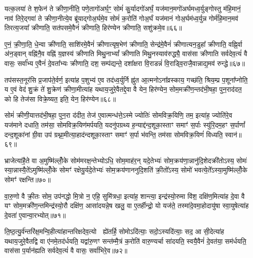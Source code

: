 {\anuvakamend[{इत॑रम्पशु॒मान्थ्स्या᳚द्या॒त्यन॑सो॒थ्सर्ग॑न्तू॒ष्णीꣳ स॑र्वदेव॒त्यं॑ वै त्रय॑स्त्रिꣳशच्च॥९॥}]}

यत्क॒लया॑ ते श॒फेन॑ ते क्रीणा॒नीति॒ पणे॒तागो॑अर्घ॒ꣳ॒ सोमं॑ कु॒र्यादगो॑अर्घं॒ यज॑मान॒मगो॑अर्घमध्व॒र्युङ्गोस्तु म॑हि॒मानं॒ नाव॑ तिरे॒द्गवा॑ ते क्रीणा॒नीत्ये॒व ब्रू॑याद्गोअ॒र्घमे॒व सोमं॑ क॒रोति॑ गोअ॒र्घं यज॑मानं गोअ॒र्घम॑ध्व॒र्युन्न गोर्म॑हि॒मान॒मव॑ तिरत्य॒जया᳚ क्रीणाति॒ सत॑पसमे॒वैनं॑ क्रीणाति॒ हिर॑ण्येन क्रीणाति॒ सशु॑क्रमे॒व॥६६॥

ए॒नं॒ क्री॒णा॒ति॒ धे॒न्वा क्री॑णाति॒ साशि॑रमे॒वैनं॑ क्रीणात्यृष॒भेण॑ क्रीणाति॒ सेन्द्र॑मे॒वैनं॑ क्रीणात्यन॒डुहा᳚ क्रीणाति॒ वह्नि॒र्वा अ॑न॒ड्वान् वह्नि॑नै॒व वह्नि॑ य॒ज्ञस्य॑ क्रीणाति मिथु॒ना\-भ्यां᳚ क्रीणाति मिथु॒नस्याव॑रुद्ध्यै॒ वास॑सा क्रीणाति सर्वदेव॒त्यं॑ वै वासः॒ सर्वा᳚भ्य ए॒वैनं॑ दे॒वता᳚भ्यः क्रीणाति॒ दश॒ सम्प॑द्यन्ते॒ दशा᳚क्षरा वि॒राडन्नं॑ वि॒राड्वि॒राजै॒वान्नाद्य॒मव॑ रुन्द्धे॥६७॥

तप॑सस्त॒नूर॑सि प्र॒जाप॑ते॒र्वर्ण॒ इत्या॑ह प॒शुभ्य॑ ए॒व तद॑ध्व॒र्युर्नि ह्नु॑त आ॒त्मनो\-ऽना᳚व्रस्काय॒ गच्छ॑ति॒ श्रिय॒म्प्र प॒शूना᳚प्नोति॒ य ए॒वं वेद॑ शु॒क्रं ते॑ शु॒क्रेण॑ क्रीणा॒मीत्या॑ह यथाय॒जुरे॒वैतद्दे॒वा वै येन॒ हिर॑ण्येन॒ सोम॒मक्री॑ण॒न्तद॑भी॒षहा॒ पुन॒राद॑दत॒ को हि तेज॑सा विक्रे॒ष्यत॒ इति॒ येन॒ हिर॑ण्येन॥६८॥

सोमं॑ क्रीणी॒यात्तद॑भी॒षहा॒ पुन॒रा द॑दीत॒ तेज॑ ए॒वात्मन्ध॑त्ते॒\-ऽस्मे ज्योतिः॑ सोमविक्र॒यिणि॒ तम॒ इत्या॑ह॒ ज्योति॑रे॒व यज॑माने दधाति॒ तम॑सा॒ सोमविक्र॒यिण॑मर्पयति॒ यदनु॑पग्रथ्य ह॒न्याद्द॑न्द॒शूका॒स्ताꣳ समाꣳ॑ स॒र्पाः स्यु॑रि॒दम॒हꣳ स॒र्पाणां᳚ दन्द॒शूका॑नां ग्री॒वा उप॑ ग्रथ्ना॒मीत्या॒हाद॑न्दशूका॒स्ताꣳ समाꣳ॑ स॒र्पा भ॑वन्ति॒ तम॑सा सोमविक्र॒यिणं॑ विध्यति॒ स्वान॑॥६९॥

भ्राजेत्या॑है॒ते वा अ॒मुष्मि॑ल्लोँ॒के सोम॑मरक्ष॒न्तेभ्यो\-ऽधि॒ सोम॒माह॑र॒न् यदे॒तेभ्यः॑ सोम॒क्रय॑णा॒न्नानु॑दि॒शेदक्री॑तो\-ऽस्य॒ सोमः॑ स्या॒न्नास्यै॒ते॑\-ऽमुष्मि॑ल्लोँ॒के सोमꣳ॑ रक्षेयु॒र्यदे॒तेभ्यः॑ सोम॒क्रय॑णाननुदि॒शति॑ क्री॒तो᳚\-ऽस्य॒ सोमो॑ भवत्ये॒ते᳚\-ऽस्या॒मुष्मि॑ल्लोँ॒के सोमꣳ॑ रक्षन्ति॥७०॥

{\anuvakamend[{सशु॑क्रमे॒व रु॑न्ध॒ इति॒ येन॒ हिर॑ण्येन॒ स्वान॒ चतु॑श्चत्वारिꣳशच्च॥10॥}]}

वा॒रु॒णो वै क्री॒तः सोम॒ उप॑नद्धो मि॒त्रो न॒ एहि॒ सुमि॑त्रधा॒ इत्या॑ह॒ शान्त्या॒ इन्द्र॑स्यो॒रुमा वि॑श॒ दक्षि॑ण॒मित्या॑ह दे॒वा वै यꣳ सोम॒मक्री॑ण॒न्तमिन्द्र॑स्यो॒रौ दक्षि॑ण॒ आसा॑दयन्ने॒ष खलु॒ वा ए॒तर्\mbox{}हीन्द्रो॒ यो यज॑ते॒ तस्मा॑दे॒वमा॒होदायु॑षा स्वा॒युषेत्या॑ह दे॒वता॑ ए॒वान्वा॒रभ्योत्॥७१॥

ति॒ष्ठ॒त्यु॒र्व॑न्तरि॑क्ष॒मन्वि॒हीत्या॑हान्तरिक्षदेव॒त्यो  ह्ये॑तर्\mbox{}हि॒ सोमो\-ऽदि॑त्याः॒ सदो॒\-ऽस्यदि॑त्याः॒ सद॒ आ सी॒देत्या॑ह यथाय॒जुरे॒वैतद्वि वा ए॑नमे॒तद॑र्धयति॒ यद्वा॑रु॒णꣳ सन्त॑म्मै॒त्रं क॒रोति॑ वारु॒ण्यर्चा सा॑दयति॒ स्वयै॒वैनं॑ दे॒वत॑या॒ सम॑र्धयति॒ वास॑सा प॒र्यान॑ह्यति सर्वदेव॒त्यं॑ वै वासः॒ सर्वा॑भिरे॒व॥७२॥

